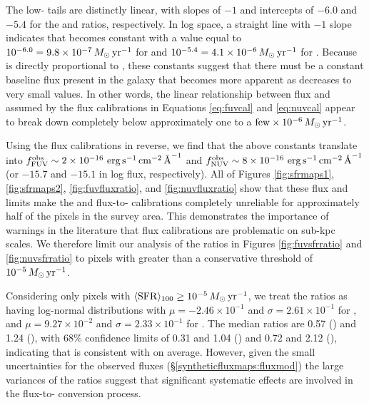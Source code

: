 \documentclass[iop, tighten]{emulateapj}
\begin{document}
The low-\sfr{} tails are distinctly linear, with slopes of $-1$ and intercepts
of $-6.0$ and $-5.4$ for the \fuv{} and \nuv{} \sfr{} ratios, respectively. In
log space, a straight line with $-1$ slope indicates that \sfrx{} becomes
constant with a value equal to $10^{-6.0} = 9.8\times 10^{-7}\,M_\odot\,\mathrm{yr}^{-1}$ for
\fuv{} and $10^{-5.4} = 4.1\times 10^{-6}\,M_\odot\,\mathrm{yr}^{-1}$ for \nuv{}. Because
\sfrx{} is directly proportional to \fxobs{}, these \sfr{} constants suggest
that there must be a constant baseline flux present in the galaxy that becomes
more apparent as \sfroneh{} decreases to very small values. In other words, the
linear relationship between flux and \sfr{} assumed by the flux calibrations in
Equations \ref{eq:fuvcal} and \ref{eq:nuvcal} appear to break down completely
below \sfroneh{} approximately one to a $\mathrm{few} \times
10^{-6}\,M_\odot\,\mathrm{yr}^{-1}$.

Using the flux calibrations in reverse, we find that the above \sfr{} constants
translate into $f_{\mathrm{FUV}}^{\mathrm{obs}} \sim 2\times 10^{-16}\, \,\mathrm{erg}\,\mathrm{s}^{-1}\,\mathrm{cm}^{-2}\,\textrm{\AA}^{-1}$ and $f_{\mathrm{NUV}}^{\mathrm{obs}} \sim
8\times 10^{-16}\, \,\mathrm{erg}\,\mathrm{s}^{-1}\,\mathrm{cm}^{-2}\,\textrm{\AA}^{-1}$ (or $-15.7$ and $-15.1$ in log flux, respectively).
All of Figures  \ref{fig:sfrmaps1}, \ref{fig:sfrmaps2}, \ref{fig:fuvfluxratio},
and \ref{fig:nuvfluxratio} show that these flux and \sfr{} limits make the
\fuv{} and \nuv{} flux-to-\sfr{} calibrations completely unreliable for
approximately half of the pixels in the survey area. This demonstrates the
importance of warnings in the literature
\citep[e.g.,][]{Murphy:2011,Kennicutt:2012,Leroy:2012} that flux calibrations
are problematic on sub-kpc scales. We therefore limit our analysis of the
\sfr{} ratios in Figures \ref{fig:fuvsfrratio} and \ref{fig:nuvsfrratio} to
pixels with \sfroneh{} greater than a conservative threshold of
$10^{-5}\,M_\odot\,\mathrm{yr}^{-1}$.

Considering only pixels with $\langle\mathrm{SFR}\rangle_{100} \ge 10^{-5}\,M_\odot\,\mathrm{yr}^{-1}$, we treat the
\sfr{} ratios as having log-normal distributions with $\mu = -2.46\times
10^{-1}$ and $\sigma = 2.61\times 10^{-1}$ for \fuv{}, and $\mu = 9.27\times
10^{-2}$ and $\sigma = 2.33\times 10^{-1}$ for \nuv{}. The median ratios are
0.57 (\fuv{}) and 1.24 (\nuv{}), with 68\% confidence limits of 0.31 and 1.04
(\fuv{}) and 0.72 and 2.12 (\nuv{}), indicating that \sfrx{} is consistent with
\sfroneh{} on average. However, given the small uncertainties for the observed
fluxes (\S \ref{syntheticfluxmaps:fluxmod}) the large variances of the \sfr{}
ratios suggest that significant systematic effects are involved in the
flux-to-\sfr{} conversion process.
\end{document}
